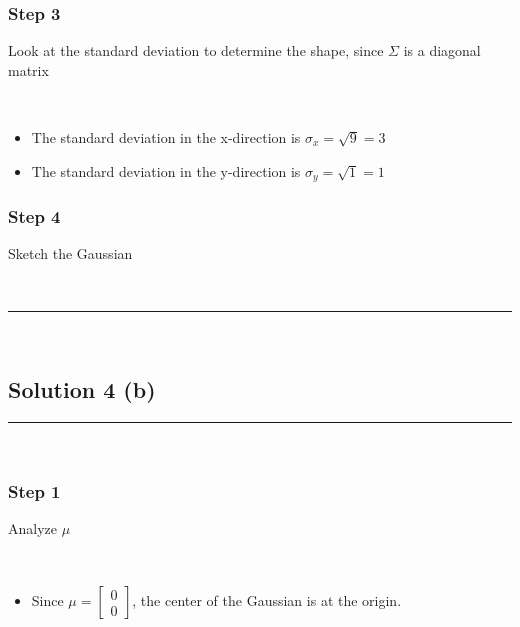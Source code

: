 \documentclass{article}
\begin{document}
\subsubsection*{Step 3}
\parbox{\textwidth}{Look at the standard deviation to determine the shape, since $\Sigma$ is a diagonal matrix}\\ 

\begin{itemize}
    \item The standard deviation in the x-direction is $\sigma_x = \sqrt{9} = 3$
    \item The standard deviation in the y-direction is $\sigma_y = \sqrt{1} = 1$
\end{itemize}
\subsubsection*{Step 4}
\parbox{\textwidth}{Sketch the Gaussian}\\

\begin{center}
\end{center}

\noindent\rule{\textwidth}{0.4pt}\\

\newpage

\subsection*{Solution 4 (b)}

\noindent\rule{\textwidth}{0.4pt}\\

\subsubsection*{Step 1}
\parbox{\textwidth}{Analyze $\mu$}\\
\begin{itemize}
    \item \parbox{\textwidth}{Since $\mu = \begin{bmatrix} 0 \\ 0 \end{bmatrix}$, the center of the Gaussian is at the origin.}\\
\end{itemize}
\end{document}
